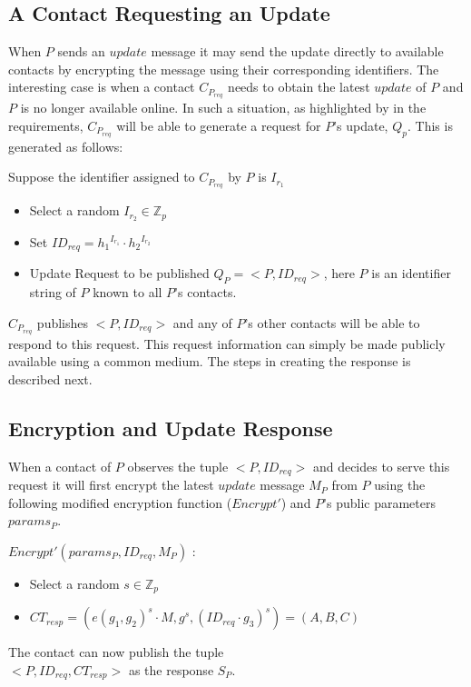 \subsection{A Contact Requesting an Update}
When $P$ sends an $update$ message it may send the update directly to available contacts by encrypting the message using their corresponding identifiers. The interesting case is when a contact $C_{P_{req}}$ needs to obtain the latest $update$ of $P$ and $P$ is no longer available online. In such a situation, as highlighted by in the requirements, $C_{P_{req}}$ will be able to generate a request for $P$'s update, $Q_p$. This is generated as follows:

Suppose the identifier assigned to $C_{P_{req}}$ by $P$ is $I_{r_1}$
\begin{itemize}
\item Select a random $I_{r_2}\in \mathbb{Z}_p$
\item Set $ID_{req} = {h_1}^{I_{r_1}} \cdot {h_2}^{I_{r_2}}$
\item Update Request to be published $Q_P = <P, ID_{req}>$, here $P$ is an identifier string of $P$ known to all $P$'s contacts.
\end{itemize}

$C_{P_{req}}$ publishes $<P, ID_{req}>$ and any of $P$'s other contacts will be able to respond to this request. This request information can simply be made publicly available using a common medium. The steps in creating the response is described next.

\subsection{Encryption and Update Response}
When a contact of $P$ observes the tuple $<P, ID_{req}>$ and decides to serve this request it will first encrypt the latest $update$ message $M_P$ from $P$ using the following modified encryption function ($Encrypt'$) and $P$'s public parameters $params_P$. 

$Encrypt' (params_P, ID_{req}, M_P)$ :

\begin{itemize}
	\item Select a random $s \in \mathbb{Z}_p$ 
	\item $CT_{resp} = (e(g_1, g_2)^s \cdot M,  g^s,  {({ID_{req}} \cdot {g_3})}^s) = (A, B, C)$
\end{itemize}

The contact can now publish the tuple \\$<P, ID_{req}, CT_{resp}>$ as the response $S_P$.

